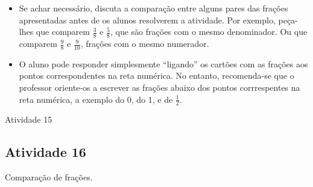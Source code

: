 \begin{multicols}{2}
\begin{itemize}
    \item       Se achar necessário, discuta a comparação entre alguns pares das frações apresentadas antes de os alunos resolverem a atividade. Por exemplo, peça-lhes que comparem       $\frac{3}{8}$        e       $\frac{5}{8}$, que são frações com o mesmo denominador. Ou que comparem       $\frac{9}{8}$       e       $\frac{9}{10}$, frações com o mesmo numerador.
    \item       O aluno pode responder simplesmente       ``ligando''       os cartões com as frações aos pontos correspondentes na reta numérica. No entanto, recomenda-se que o professor oriente-os a escrever as frações abaixo dos pontos corrrespentes na reta numérica, a exemplo do 0, do 1, e de       $\frac{1}{2}$.
\end{itemize} %
 
\begin{resposta*}{Atividade 15}

  
\end{resposta*}

\subsection{Atividade 16}

   Comparação de frações.


\end{multicols}
